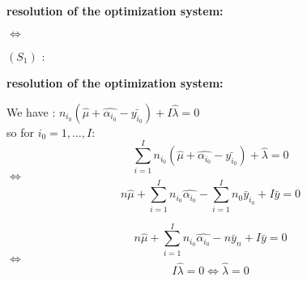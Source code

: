 \documentclass[unknownkeysallowed]{beamer}
\begin{document}
\begin{frame}
\bigskip
\bigskip
\begin{center}{
\LARGE\color{marron}
\textbf{resolution of the optimization system:}
\textbf{ }\\
\vspace{0.5cm}
}

\color{marron}
\end{center}




$\Leftrightarrow$  \\

        \item $(S_1)$ : 
        




\end{frame}
\begin{frame}
\bigskip
\bigskip
\begin{center}{
\LARGE\color{marron}
\textbf{resolution of the optimization system:}
\textbf{ }\\
\vspace{0.5cm}
}

\color{marron}
\end{center}

\vspace{0.5cm}
We have :  
$n_{i_0}(\hat{\mu}+\hat{\alpha_{i_0}}-\bar{y_{i_0}}) +I\hat{\lambda}=0$ \\ 
so for $i_0=1,...,I$: $$\sum\limits_{i=1}^{I} n_{i_0}(\hat{\mu}+\hat{\alpha_{i_0}}-\bar{y_{i_0}}) +\hat{\lambda}=0 $$
$\Leftrightarrow$   
$$n\hat{\mu}+ \sum\limits_{i=1}^{I} n_{i_0}\hat{\alpha_{i_0}}- \sum\limits_{i=1}^{I} n_0\bar{y}_{i_0}+I\bar{y}=0$$

$$n\hat{\mu}+ \sum\limits_{i=1}^{I} n_{i_0}\hat{\alpha_{i_0}}- n\bar{y}_n+I\bar{y}=0$$
$\Leftrightarrow$ $$I\hat{\lambda}=0 \Leftrightarrow \hat{\lambda}=0  $$
\end{frame}
\end{document}
